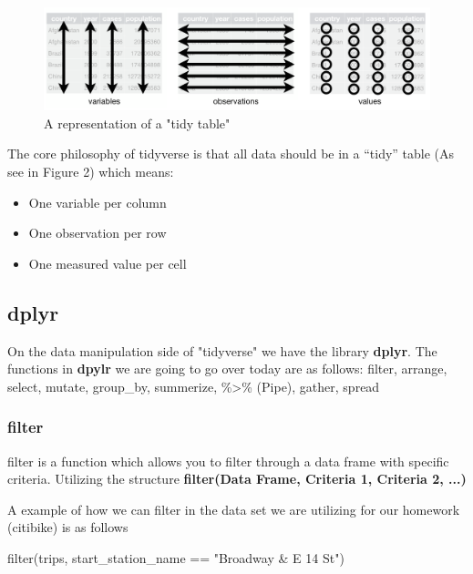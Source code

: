 \begin{figure}[h]
    \centering
    \includegraphics[width=.65\textwidth]{figures/tidy_table.PNG}
    \caption{A representation of a "tidy table"}
    \label{fig:tidy_table}
\end{figure}

\begin{flushleft}

The core philosophy of tidyverse is that all data should be in a “tidy” table (As see in Figure 2) which means:
\begin{itemize}
    \item One variable per column
    \item One observation per row
    \item One measured value per cell
\end{itemize}
\end{flushleft}


\subsection{dplyr}

\begin{flushleft}
On the data manipulation side of "tidyverse" we have the library \textbf{dplyr}. The functions in \textbf{dpylr} we are going to go over today are as follows: filter, arrange, select, mutate, group\_by, summerize, \%\textgreater\% (Pipe), gather, spread
\end{flushleft}

\subsubsection{filter}
\begin{flushleft}
filter is a function which allows you to filter through a data frame with specific criteria. Utilizing the structure 
\textbf{filter(Data Frame, Criteria 1, Criteria 2, ...)}
\end{flushleft}

\begin{flushleft}
A example of how we can filter in the data set we are utilizing for our homework (citibike) is as follows
\end{flushleft}
\begin{center}
filter(trips, start\_station\_name == "Broadway \& E 14 St")
\end{center}

